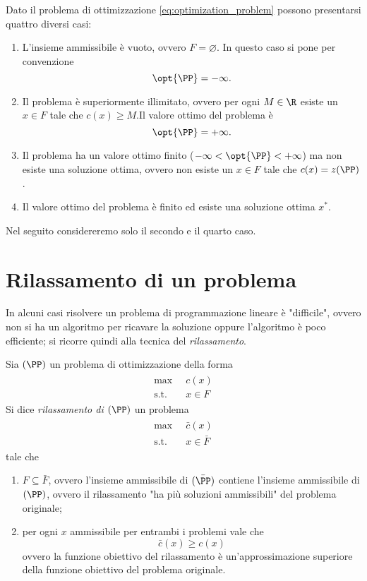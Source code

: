 Dato il problema di ottimizzazione \eqref{eq:optimization_problem} possono presentarsi quattro diversi casi: \begin{enumerate}[label={(\arabic*)}]
    \item L'insieme ammissibile è vuoto, ovvero $F = \varnothing$. In questo caso si pone per convenzione \[
        \opt{\PP} = -\infty.    
    \]
    \item Il problema è superiormente illimitato, ovvero per ogni $M \in \R$ esiste un $x \in F$ tale che $c(x) \geq M$.Il valore ottimo del problema è \[
        \opt{\PP} = +\infty.    
    \]
    \item Il problema ha un valore ottimo finito ($-\infty < \opt{\PP} < +\infty$) ma non esiste una soluzione ottima, ovvero non esiste un $x \in F$ tale che $c(x) = z(\PP)$.
    \item Il valore ottimo del problema è finito ed esiste una soluzione ottima $x^\ast$.
\end{enumerate}

Nel seguito considereremo solo il secondo e il quarto caso.

\section{Rilassamento di un problema}

In alcuni casi risolvere un problema di programmazione lineare è "difficile", ovvero non si ha un algoritmo per ricavare la soluzione oppure l'algoritmo è poco efficiente; si ricorre quindi alla tecnica del \emph{rilassamento}.

\begin{definition}
    Sia $(\PP)$ un problema di ottimizzazione della forma
    \begin{align}
        \tag{$\PP$} 
        \begin{split} 
            \max             &\;\; c(x) \\
            \text{s.t.} &\;\; x \in F
        \end{split}
    \end{align}
    Si dice \emph{rilassamento di $(\PP)$} un problema 
    \begin{align}
        \tag{$\bar\PP$} 
        \begin{split} 
            \max             &\;\; \bar c(x) \\
            \text{s.t.} &\;\; x \in \bar F
        \end{split}
    \end{align}
    tale che \begin{enumerate}[label={(\roman*)}]
        \item $F \subseteq \bar F$, ovvero l'insieme ammissibile di $(\bar\PP)$ contiene l'insieme ammissibile di $(\PP)$, ovvero il rilassamento "ha più soluzioni ammissibili" del problema originale;
        \item per ogni $x$ ammissibile per entrambi i problemi vale che \[
            \bar c(x) \geq c(x)    
        \] ovvero la funzione obiettivo del rilassamento è un'approssimazione superiore della funzione obiettivo del problema originale.
    \end{enumerate}
\end{definition}

